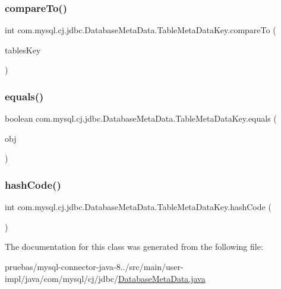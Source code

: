 \subsubsection{\texorpdfstring{compare\+To()}{compareTo()}}
{\footnotesize\ttfamily int com.\+mysql.\+cj.\+jdbc.\+Database\+Meta\+Data.\+Table\+Meta\+Data\+Key.\+compare\+To (\begin{DoxyParamCaption}\item[{\mbox{\hyperlink{classcom_1_1mysql_1_1cj_1_1jdbc_1_1_database_meta_data_1_1_table_meta_data_key}{Table\+Meta\+Data\+Key}}}]{tables\+Key }\end{DoxyParamCaption})}

\mbox{\label{classcom_1_1mysql_1_1cj_1_1jdbc_1_1_database_meta_data_1_1_table_meta_data_key_a528b5033f91e8c4c16f86af5d217b474}} 
\subsubsection{\texorpdfstring{equals()}{equals()}}
{\footnotesize\ttfamily boolean com.\+mysql.\+cj.\+jdbc.\+Database\+Meta\+Data.\+Table\+Meta\+Data\+Key.\+equals (\begin{DoxyParamCaption}\item[{Object}]{obj }\end{DoxyParamCaption})}

\mbox{\label{classcom_1_1mysql_1_1cj_1_1jdbc_1_1_database_meta_data_1_1_table_meta_data_key_a4191e1d451e0c19fc531c2eb7cf047fb}} 
\subsubsection{\texorpdfstring{hash\+Code()}{hashCode()}}
{\footnotesize\ttfamily int com.\+mysql.\+cj.\+jdbc.\+Database\+Meta\+Data.\+Table\+Meta\+Data\+Key.\+hash\+Code (\begin{DoxyParamCaption}{ }\end{DoxyParamCaption})}



The documentation for this class was generated from the following file\+:\begin{DoxyCompactItemize}
\item 
pruebas/mysql-\/connector-\/java-\/8../src/main/user-\/impl/java/com/mysql/cj/jdbc/\mbox{\hyperlink{_database_meta_data_8java}{Database\+Meta\+Data.\+java}}\end{DoxyCompactItemize}
